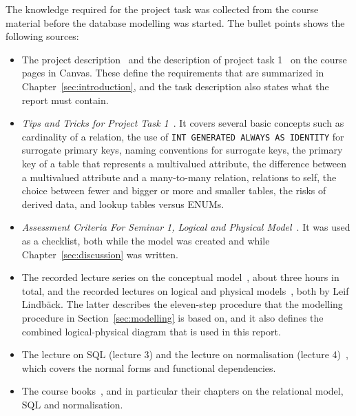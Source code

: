 \documentclass[a4paper]{scrartcl}
\renewcommand{\_}{\textunderscore\allowbreak}
\begin{document}

The knowledge required for the project task was collected from the course material before the database modelling was started. The bullet points shows the following sources:

\begin{itemize}
  \item The project description~\cite{project} and the description of project task 1~\cite{task1} on the course pages in Canvas. These define the requirements that are summarized in Chapter~\ref{sec:introduction}, and the task description also states what the report must contain.
  \item \textit{Tips and Tricks for Project Task 1}~\cite{tips}. It covers several basic concepts such as cardinality of a relation, the use of \texttt{INT GENERATED ALWAYS AS IDENTITY} for surrogate primary keys, naming conventions for surrogate keys, the primary key of a table that represents a multivalued attribute, the difference between a multivalued attribute and a many-to-many relation, relations to self, the choice between fewer and bigger or more and smaller tables, the risks of derived data, and lookup tables versus ENUMs.
  \item \textit{Assessment Criteria For Seminar 1, Logical and Physical Model}~\cite{criteria}. It was used as a checklist, both while the model was created and while Chapter~\ref{sec:discussion} was written.
  \item The recorded lecture series on the conceptual model~\cite{conceptuallecture}, about three hours in total, and the recorded lectures on logical and physical models~\cite{logicallecture}, both by Leif Lindbäck. The latter describes the eleven-step procedure that the modelling procedure in Section~\ref{sec:modelling} is based on, and it also defines the combined logical-physical diagram that is used in this report.
  \item The lecture on SQL (lecture 3) and the lecture on normalisation (lecture 4)~\cite{normalisationlecture}, which covers the normal forms and functional dependencies.
  \item The course books~\cite{elmasri,silberschatz}, and in particular their chapters on the relational model, SQL and normalisation.
\end{itemize}
\end{document}
